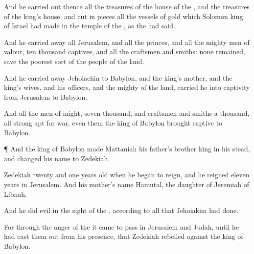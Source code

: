 {And he carried
out thence all the
treasures of the
house of the
{}, and the
treasures of the
king’s
house, and cut in
pieces all the
vessels of
gold which
Solomon
king of
Israel had
made in the
temple of the
{}, as the
{} had
said.

And he carried
away all
Jerusalem, and all the
princes, and all the mighty
men of
valour,
{}
ten
thousand
captives, and all the
craftsmen and
smiths: none
remained,
save the poorest
sort of the
people of the
land.

And he carried
away
Jehoiachin to
Babylon, and the
king’s
mother, and the
king’s
wives, and his
officers, and the
mighty of the
land,
{}
carried he into
captivity from
Jerusalem to
Babylon.

And all the
men of
might,
{}
seven
thousand, and
craftsmen and
smiths a
thousand, all
{}
strong
{}
apt for
war, even them the
king of
Babylon
brought
captive to
Babylon.


\par }{\PP {}¶ And the
king of
Babylon made
Mattaniah his
father’s brother
king in his stead, and
changed his
name to
Zedekiah.

Zedekiah
{}
twenty and
one
years
old when he began to
reign, and he
reigned
eleven
years in
Jerusalem. And his
mother’s
name
{}
Hamutal, the
daughter of
Jeremiah of
Libnah.

And he
did
{}
evil in the
sight of the
{}, according to all that
Jehoiakim had
done.

For through the
anger of the
{} it came to pass in
Jerusalem and
Judah, until he had cast them
out from his
presence, that
Zedekiah
rebelled against the
king of
Babylon.




\par }
